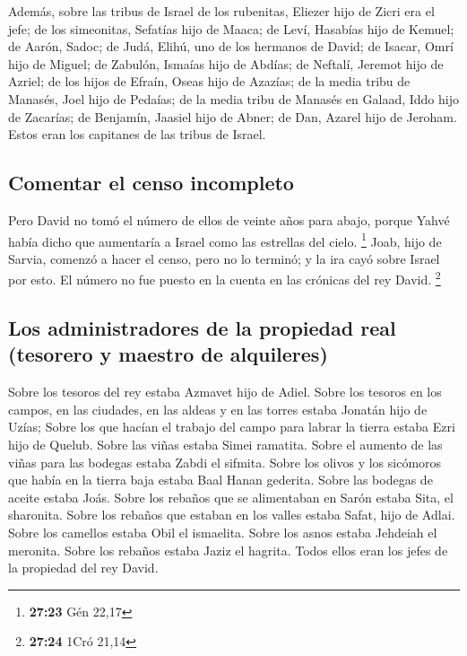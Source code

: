 \begin{paracol}{2}
 Además, sobre las tribus de Israel de los rubenitas,
Eliezer hijo de Zicri era el jefe; de los simeonitas, Sefatías hijo de
Maaca;  de Leví, Hasabías hijo de Kemuel; de Aarón,
Sadoc;  de Judá, Elihú, uno de los hermanos de David; de
Isacar, Omrí hijo de Miguel;  de Zabulón, Ismaías hijo de
Abdías; de Neftalí, Jeremot hijo de Azriel;  de los hijos
de Efraín, Oseas hijo de Azazías; de la media tribu de Manasés, Joel
hijo de Pedaías;  de la media tribu de Manasés en Galaad,
Iddo hijo de Zacarías; de Benjamín, Jaasiel hijo de Abner;
 de Dan, Azarel hijo de Jeroham. Estos eran los capitanes
de las tribus de Israel.

\hypertarget{comentar-el-censo-incompleto}{%
\subsection{Comentar el censo
incompleto}\label{comentar-el-censo-incompleto}}

 Pero David no tomó el número de ellos de veinte años
para abajo, porque Yahvé había dicho que aumentaría a Israel como las
estrellas del cielo. \footnote{\textbf{27:23} Gén 22,17} 
Joab, hijo de Sarvia, comenzó a hacer el censo, pero no lo terminó; y la
ira cayó sobre Israel por esto. El número no fue puesto en la cuenta en
las crónicas del rey David. \footnote{\textbf{27:24} 1Cró 21,14}

\hypertarget{los-administradores-de-la-propiedad-real-tesorero-y-maestro-de-alquileres}{%
\subsection{Los administradores de la propiedad real (tesorero y maestro
de
alquileres)}\label{los-administradores-de-la-propiedad-real-tesorero-y-maestro-de-alquileres}}

 Sobre los tesoros del rey estaba Azmavet hijo de Adiel.
Sobre los tesoros en los campos, en las ciudades, en las aldeas y en las
torres estaba Jonatán hijo de Uzías;  Sobre los que
hacían el trabajo del campo para labrar la tierra estaba Ezri hijo de
Quelub.  Sobre las viñas estaba Simei ramatita. Sobre el
aumento de las viñas para las bodegas estaba Zabdi el sifmita.
 Sobre los olivos y los sicómoros que había en la tierra
baja estaba Baal Hanan gederita. Sobre las bodegas de aceite estaba
Joás.  Sobre los rebaños que se alimentaban en Sarón
estaba Sita, el sharonita. Sobre los rebaños que estaban en los valles
estaba Safat, hijo de Adlai.  Sobre los camellos estaba
Obil el ismaelita. Sobre los asnos estaba Jehdeiah el meronita. Sobre
los rebaños estaba Jaziz el hagrita.  Todos ellos eran
los jefes de la propiedad del rey David.


\end{paracol}
